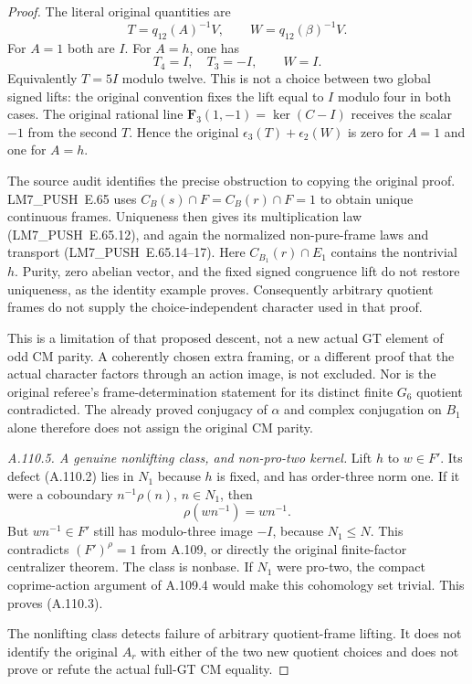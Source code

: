 \begin{proof}
The literal original quantities are
\[
 T=q_{12}(A)^{-1}V,\qquad W=q_{12}(\beta)^{-1}V.
 \tag{A.110.9}
\]
For \(A=1\) both are \(I\). For \(A=h\), one has
\[
 T_4=I,\quad T_3=-I,\qquad W=I.
 \]
Equivalently \(T=5I\) modulo twelve. This is not a choice between
two global signed lifts: the original convention fixes the lift
equal to \(I\) modulo four in both cases.
The original rational line
\(\mathbf F_3(1,-1)=\ker(C-I)\) receives the scalar \(-1\) from
the second \(T\). Hence the original
\(\epsilon_3(T)+\epsilon_2(W)\) is zero for \(A=1\) and one for
\(A=h\).

The source audit identifies the precise obstruction to copying
the original proof. LM7\_PUSH~E.65 uses
\(C_B(s)\cap F=C_B(r)\cap F=1\) to obtain unique continuous frames.
Uniqueness then gives its multiplication law (LM7\_PUSH~E.65.12), and again
the normalized non-pure-frame laws and transport (LM7\_PUSH~E.65.14--17).
Here \(C_{B_1}(r)\cap E_1\) contains the nontrivial \(h\).
Purity, zero abelian vector, and the fixed signed congruence lift
do not restore uniqueness, as the identity example proves.
Consequently arbitrary quotient frames do not supply the
choice-independent character used in that proof.

This is a limitation of that proposed descent, not a new actual
GT element of odd CM parity. A coherently chosen extra framing,
or a different proof that the actual character factors through
an action image, is not excluded. Nor is the original referee's
frame-determination statement for its distinct finite \(G_6\)
quotient contradicted. The already proved conjugacy of
\(\alpha\) and complex conjugation on \(B_1\) alone therefore
does not assign the original CM parity.

\emph{A.110.5. A genuine nonlifting class, and non-pro-two kernel.}
Lift \(h\) to \(w\in F'\). Its defect (A.110.2) lies in \(N_1\)
because \(h\) is fixed, and has order-three norm one.
If it were a coboundary \(n^{-1}\rho(n)\), \(n\in N_1\), then
\[
 \rho(wn^{-1})=wn^{-1}.
 \]
But \(wn^{-1}\in F'\) still has modulo-three image \(-I\), because
\(N_1\le N\). This contradicts \((F')^\rho=1\) from A.109,
or directly the original finite-factor centralizer theorem.
The class is nonbase. If \(N_1\) were pro-two, the compact
coprime-action argument of A.109.4 would make this cohomology
set trivial. This proves (A.110.3).

The nonlifting class detects failure of arbitrary quotient-frame
lifting. It does not identify the original \(A_r\) with either
of the two new quotient choices and does not prove or refute the
actual full-GT CM equality.
\end{proof}


